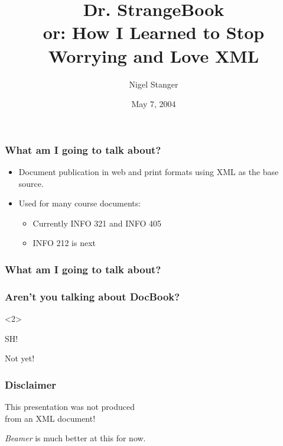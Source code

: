 \documentclass[pdftex]{beamer}
\author{Nigel Stanger}
\title{Dr. StrangeBook \\ \footnotesize or: How I Learned to Stop Worrying and Love XML}
\institute{Department of Information Science}
\date{May 7, 2004}
\begin{document}
\frame{\titlepage}


\frame
{
	\frametitle{What am I going to talk about?}
	
	\begin{itemize}
	
		\item Document publication in web and print formats using XML
		as the base source.
		
		\item Used for many course documents:
		
		\begin{itemize}
		
			\item Currently INFO 321 and INFO 405
			
			\item INFO 212 is next
			
		\end{itemize}
	
	\end{itemize}
}


\frame
{
	\frametitle{What am I going to talk about?}
	
	\tableofcontents
}


\frame
{
	\frametitle{Aren't you talking about DocBook?}
	
	
	\begin{center}
	
		\begin{uncoverenv}<2>

			{\Huge\alert{SH!}}
			
			\vspace*{1cm}
		
			Not yet!
		
		\end{uncoverenv}
	
	\end{center}	
}


\frame
{
	\frametitle{Disclaimer}
	
	\begin{center}
	
		{\LARGE\alert{This presentation was not produced \\
		from an XML document!}}
		
		\vspace*{1cm}
		
		\emph{Beamer} is much better at this for now.
	
	\end{center}
}
\end{document}
